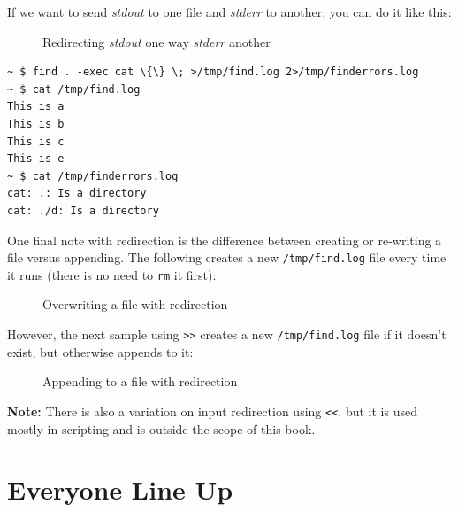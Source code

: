 \documentclass[10pt,american,]{book}
\newenvironment{Shaded}{\begin{snugshade}}{\end{snugshade}}
\newcommand{\KeywordTok}[1]{\textcolor[rgb]{0.13,0.29,0.53}{\textbf{{#1}}}}
\newcommand{\DataTypeTok}[1]{\textcolor[rgb]{0.13,0.29,0.53}{{#1}}}
\newcommand{\NormalTok}[1]{{#1}}
\numberwithin{figure}{chapter}
\DeclareRobustCommand{\drcap}[1]{\begin{figure}[H]\caption{#1}\end{figure}}
\renewcommand{\KeywordTok}[1]{{#1}}
\renewcommand{\DataTypeTok}[1]{{#1}}
\renewcommand{\NormalTok}[1]{{#1}}
\begin{document}
If we want to send \emph{stdout} to one file and \emph{stderr} to
another, you can do it like this:

\drcap{Redirecting \textit{stdout} one way \textit{stderr} another}

\begin{verbatim}
~ $ find . -exec cat \{\} \; >/tmp/find.log 2>/tmp/finderrors.log
~ $ cat /tmp/find.log
This is a
This is b
This is c
This is e
~ $ cat /tmp/finderrors.log
cat: .: Is a directory
cat: ./d: Is a directory
\end{verbatim}

One final note with redirection is the difference between creating or
re-writing a file versus appending. The following creates a new
\texttt{/tmp/find.log} file every time it runs (there is no need to
\texttt{rm} it first):

\drcap{Overwriting a file with redirection}

\begin{Shaded}
\end{Shaded}

However, the next sample using
\texttt{\textgreater{}\textgreater{}}
 creates a new
\texttt{/tmp/find.log} file if it doesn't exist, but otherwise appends
to it:

\drcap{Appending to a file with redirection}

\begin{Shaded}
\end{Shaded}

\textbf{Note:} There is also a variation on input redirection using
\texttt{\textless{}\textless{}}, but it is used mostly in scripting and
is outside the scope of this book.

\section*{Everyone Line Up}\label{everyone-line-up}
\end{document}
